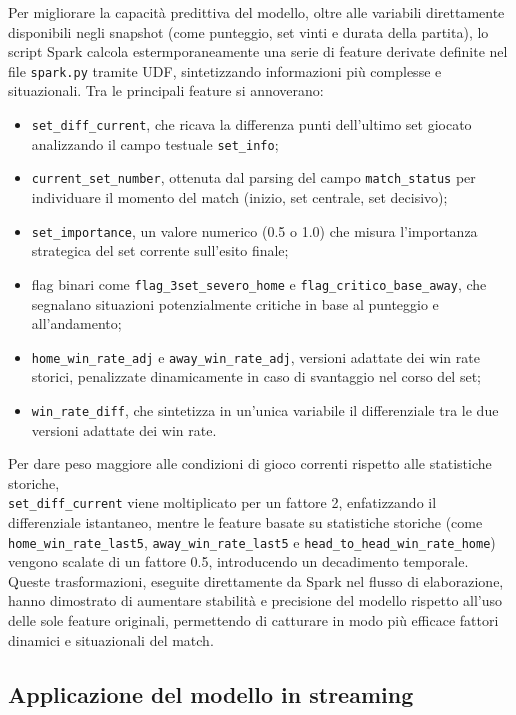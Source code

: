 \documentclass[a4paper,12pt]{report}
\begin{document}
Per migliorare la capacità predittiva del modello, oltre alle variabili direttamente disponibili negli snapshot (come punteggio, set vinti e durata della partita), lo script Spark calcola estermporaneamente una serie di feature derivate definite nel file \texttt{spark.py} tramite UDF, sintetizzando informazioni più complesse e situazionali. Tra le principali feature si annoverano:
\begin{itemize}
  \item \texttt{set\_diff\_current}, che ricava la differenza punti dell’ultimo set giocato analizzando il campo testuale \texttt{set\_info};
  \item \texttt{current\_set\_number}, ottenuta dal parsing del campo \texttt{match\_status} per individuare il momento del match (inizio, set centrale, set decisivo);
  \item \texttt{set\_importance}, un valore numerico (0.5 o 1.0) che misura l’importanza strategica del set corrente sull’esito finale;
  \item flag binari come \texttt{flag\_3set\_severo\_home} e \texttt{flag\_critico\_base\_away}, che segnalano situazioni potenzialmente critiche in base al punteggio e all’andamento;
  \item \texttt{home\_win\_rate\_adj} e \texttt{away\_win\_rate\_adj}, versioni adattate dei win rate storici, penalizzate dinamicamente in caso di svantaggio nel corso del set;
  \item \texttt{win\_rate\_diff}, che sintetizza in un’unica variabile il differenziale tra le due versioni adattate dei win rate.
\end{itemize}
Per dare peso maggiore alle condizioni di gioco correnti rispetto alle statistiche storiche,\\ \texttt{set\_diff\_current} viene moltiplicato per un fattore 2, enfatizzando il differenziale istantaneo, mentre le feature basate su statistiche storiche (come \texttt{home\_win\_rate\_last5}, \texttt{away\_win\_rate\_last5} e  \texttt{head\_to\_head\_win\_rate\_home}) vengono scalate di un fattore 0.5, introducendo un decadimento temporale. Queste trasformazioni, eseguite direttamente da Spark nel flusso di elaborazione, hanno dimostrato di aumentare stabilità e precisione del modello rispetto all’uso delle sole feature originali, permettendo di catturare in modo più efficace fattori dinamici e situazionali del match.



\subsection{Applicazione del modello in streaming}
\end{document}
